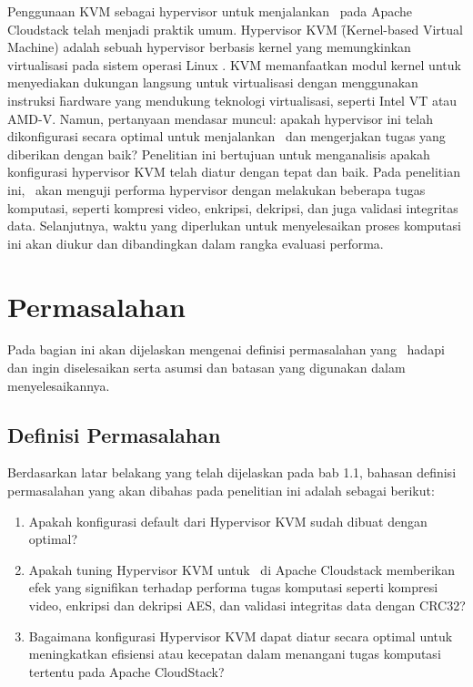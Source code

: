 Penggunaan KVM sebagai hypervisor untuk menjalankan \vm\ pada Apache Cloudstack telah menjadi praktik umum. Hypervisor KVM \f{(Kernel-based Virtual Machine)} adalah sebuah hypervisor berbasis kernel yang memungkinkan virtualisasi pada sistem operasi Linux \cite{whatiskvm}. KVM memanfaatkan modul kernel untuk menyediakan dukungan langsung untuk virtualisasi dengan menggunakan instruksi \f{hardware} yang mendukung teknologi virtualisasi, seperti Intel VT atau AMD-V. Namun, pertanyaan mendasar muncul: apakah hypervisor ini telah dikonfigurasi secara optimal untuk menjalankan \vm\ dan mengerjakan tugas yang diberikan dengan baik? Penelitian ini bertujuan untuk menganalisis apakah konfigurasi hypervisor KVM telah diatur dengan tepat dan baik. Pada penelitian ini, \saya\ akan menguji performa hypervisor dengan melakukan beberapa tugas komputasi, seperti kompresi video, enkripsi, dekripsi, dan juga validasi integritas data. Selanjutnya, waktu yang diperlukan untuk menyelesaikan proses komputasi ini akan diukur dan dibandingkan dalam rangka evaluasi performa.


\section{Permasalahan}
Pada bagian ini akan dijelaskan mengenai definisi permasalahan yang \saya\ hadapi dan ingin diselesaikan serta asumsi dan batasan yang digunakan dalam menyelesaikannya.

\subsection{Definisi Permasalahan}
Berdasarkan latar belakang yang telah dijelaskan pada bab 1.1, bahasan definisi permasalahan yang akan dibahas pada penelitian ini adalah sebagai berikut:
\begin{enumerate}
      \item Apakah konfigurasi default dari Hypervisor KVM sudah dibuat dengan optimal?
      \item Apakah tuning Hypervisor KVM untuk \vm\ di Apache Cloudstack memberikan efek yang signifikan terhadap performa tugas komputasi seperti kompresi video, enkripsi dan dekripsi AES, dan validasi integritas data dengan CRC32?
      \item Bagaimana konfigurasi Hypervisor KVM dapat diatur secara optimal untuk meningkatkan efisiensi atau kecepatan dalam menangani tugas komputasi tertentu pada Apache CloudStack?
\end{enumerate}

